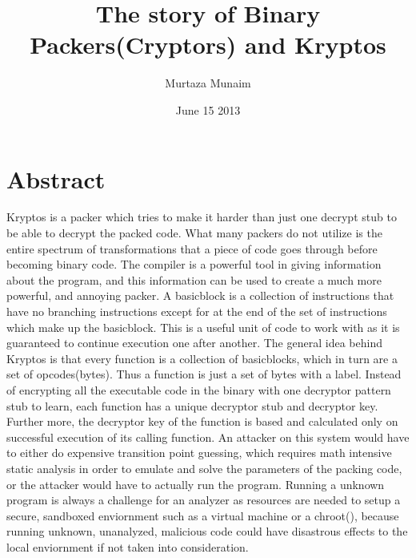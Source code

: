 \documentclass{article}
\title{The story of Binary Packers(Cryptors) and Kryptos}
\author{Murtaza Munaim}
\date{June 15 2013}
\begin{document}
\maketitle

\section{Abstract}

Kryptos is a packer which tries to make it harder than just one decrypt stub to be able to decrypt the packed code. What many packers do not utilize is the entire spectrum of transformations that a piece of code goes through before becoming binary code. The compiler is a powerful tool in giving information about the program, and this information can be used to create a much more powerful, and annoying packer. A basicblock is a collection of instructions that have no branching instructions except for at the end of the set of instructions which make up the basicblock. This is a useful unit of code to work with as it is guaranteed to continue execution one after another. The general idea behind Kryptos is that every function is a collection of basicblocks, which in turn are a set of opcodes(bytes). Thus a function is just a set of bytes with a label. Instead of encrypting all the executable code in the binary with one decryptor pattern stub to learn, each function has a unique decryptor stub and decryptor key. Further more, the decryptor key of the function is based and calculated only on successful execution of its calling function. An attacker on this system would have to either do expensive transition point guessing, which requires math intensive static analysis in order to emulate and solve the parameters of the packing code, or the attacker would have to actually run the program. Running a unknown program is always a challenge for an analyzer as resources are needed to setup a secure, sandboxed enviornment such as a virtual machine or a chroot(), because running unknown, unanalyzed, malicious code could have disastrous effects to the local enviornment if not taken into consideration. \newline
\end{document}

